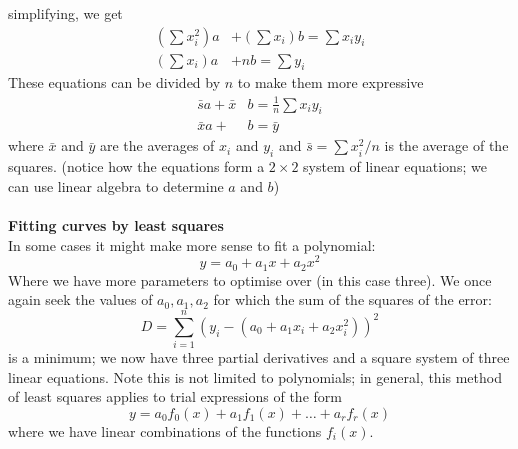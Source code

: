 \documentclass{report}
\begin{document}
simplifying, we get
\begin{align*}
\left(\sum x_i^2\right)a&+\left(\sum x_i\right)b=\sum x_iy_i\\
\left(\sum x_i\right)a&+nb=\sum y_i
\end{align*}
These equations can be divided by $n$ to make them more expressive
\begin{align*}
\bar{s}a+\bar{x}&b=\frac{1}{n}\sum x_iy_i\\
\bar{x}a+&b=\bar{y}
\end{align*}
where $\bar{x}$ and $\bar{y}$ are the averages of $x_i$ and $y_i$ and $\bar{s}=\sum x_i^2/n$ is the average 
of the squares. (notice how the equations form a $2\times2$ system of linear equations; we can use linear algebra
to determine $a$ and $b$)\\
\vspace{1mm}\\
\textbf{Fitting curves by least squares}\\
In some cases it might make more sense to fit a polynomial:\begin{equation*}
y=a_0+a_1x+a_2x^2
\end{equation*}
Where we have more parameters to optimise over (in this case three). We once again seek the values of 
$a_0,a_1,a_2$ for which the sum of the squares of the error:
\begin{equation*}
D=\sum^n_{i=1}(y_i-(a_0+a_1x_i+a_2x_i^2))^2
\end{equation*}
is a minimum; we now have three partial derivatives and a square system of three linear equations.
Note this is not limited to polynomials; in general, this method of least squares applies to 
trial expressions of the form
\begin{equation*}
y=a_0f_0(x)+a_1f_1(x)+\ldots+a_rf_r(x)
\end{equation*}
where we have linear combinations of the functions $f_i(x)$.
\newpage
\end{document}
